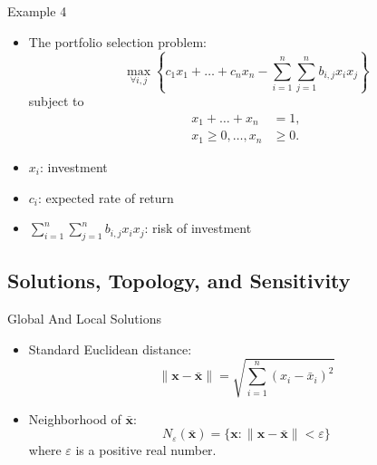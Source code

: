 \documentclass[aspectratio=169,hyperref,UTF8,CJK]{beamer}
\newcommand{\vect}[1]{\boldsymbol{#1}}
\begin{document}
\begin{frame}{Example 4}
  \small
  \begin{itemize}
    \item The portfolio selection problem:
      \begin{equation*}
        \max_{\forall i,j}\left\{c_1x_1+\ldots+c_nx_n-\sum_{i=1}^{n}\sum_{j=1}^{n}b_{i,j}x_ix_j\right\}
      \end{equation*}
      subject to
      \begin{align*}
        x_1+\ldots+x_n&=1,\\
        x_1\ge0,\ldots,x_n&\ge0.
      \end{align*}
    \item $x_i$: investment
    \item $c_i$: expected rate of return
    \item $\sum_{i=1}^{n}\sum_{j=1}^{n}b_{i,j}x_ix_j$: risk of investment
  \end{itemize}
\end{frame}

\subsection{Solutions, Topology, and Sensitivity}

\begin{frame}{Global And Local Solutions}
  \begin{itemize}
    \item Standard Euclidean distance:
      \begin{equation*}
        \lVert\vect{x}-\bar{\vect{x}}\rVert=\sqrt{\sum_{i=1}^{n}(x_i-\bar{x}_i)^2}
      \end{equation*}
    \item Neighborhood of $\bar{\vect{x}}$:
      \begin{equation*}
        N_{\varepsilon}(\bar{\vect{x}})=\{\vect{x}:\lVert\vect{x}-\bar{\vect{x}}\rVert<\varepsilon\}
      \end{equation*}
      where $\varepsilon$ is a positive real number.
  \end{itemize}
\end{frame}
\end{document}
